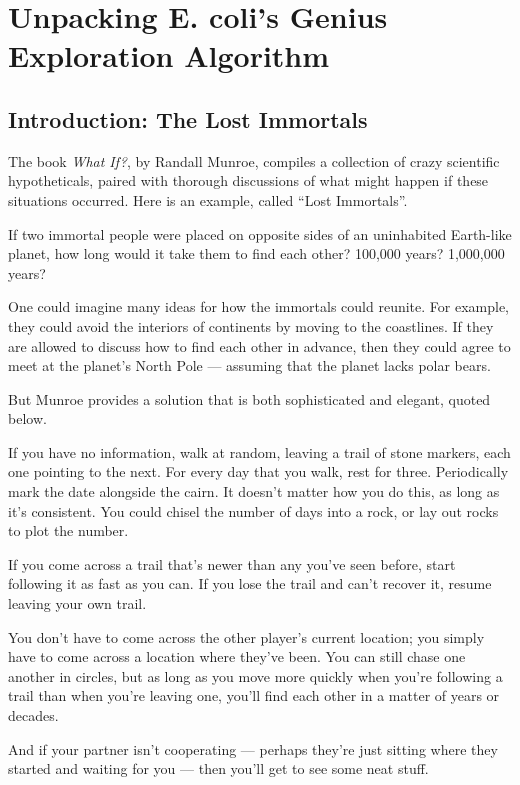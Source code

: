 \chapter[Unpacking E. coli’s Genius Exploration Algorithm]{Unpacking E. coli’s Genius Exploration Algorithm}
\label{chapter:chemotaxis}
\renewcommand{\chaptertitle}{Unpacking E. coli’s Genius Exploration Algorithm}

\FloatBarrier

\section{Introduction: The Lost Immortals}
\label{sec:introduction}

The book \textit{What If?}, by Randall Munroe, compiles a collection of crazy scientific hypotheticals, paired with thorough discussions of what might happen if these situations occurred. Here is an example, called ``Lost Immortals''.

\begin{itquote}
If two immortal people were placed on opposite sides of an uninhabited Earth-like planet, how long would it take them to find each other? 100,000 years? 1,000,000 years?
\end{itquote}

One could imagine many ideas for how the immortals could reunite. For example, they could avoid the interiors of continents by moving to the coastlines. If they are allowed to discuss how to find each other in advance, then they could agree to meet at the planet's North Pole --- assuming that the planet lacks polar bears.

But Munroe provides a solution that is both sophisticated and elegant, quoted below.

\begin{itquote}
If you have no information, walk at random, leaving a trail of stone markers, each one pointing to the next. For every day that you walk, rest for three. Periodically mark the date alongside the cairn. It doesn’t matter how you do this, as long as it’s consistent. You could chisel the number of days into a rock, or lay out rocks to plot the number.

If you come across a trail that’s newer than any you’ve seen before, start following it as fast as you can. If you lose the trail and can’t recover it, resume leaving your own trail.

You don’t have to come across the other player’s current location; you simply have to come across a location where they’ve been. You can still chase one another in circles, but as long as you move more quickly when you’re following a trail than when you’re leaving one, you’ll find each other in a matter of years or decades.

And if your partner isn’t cooperating --- perhaps they’re just sitting where they started and waiting for you --- then you’ll get to see some neat stuff.
\end{itquote}

